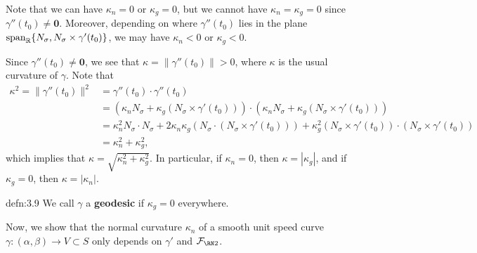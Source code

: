 Note that we can have $\kappa_n = 0$ or $\kappa_g = 0$, but we cannot 
have $\kappa_n = \kappa_g = 0$ since $\gamma''(t_0) \neq \mathbf 0$. 
Moreover, depending on where $\gamma''(t_0)$ lies in the plane 
$\operatorname{span}_{\mathbb{R}}\{N_\sigma, N_\sigma \times \gamma'(t_0)\}$, we may have 
$\kappa_n < 0$ or $\kappa_g < 0$. 

Since $\gamma''(t_0) \neq \mathbf 0$, we see that 
$\kappa = \|\gamma''(t_0)\| > 0$,
where $\kappa$ is the usual curvature of $\gamma$. Note that 
\begin{align*}
    \kappa^2 = \|\gamma''(t_0)\|^2 
    &= \gamma''(t_0) \cdot \gamma''(t_0) \\
    &= (\kappa_n N_\sigma + \kappa_g(N_\sigma \times \gamma'(t_0))) 
    \cdot (\kappa_n N_\sigma + \kappa_g(N_\sigma \times \gamma'(t_0))) \\
    &= \kappa_n^2 N_\sigma \cdot N_\sigma + 2\kappa_n \kappa_g 
    (N_\sigma \cdot (N_\sigma \times \gamma'(t_0))) + \kappa_g^2 
    (N_\sigma \times \gamma'(t_0)) \cdot (N_\sigma \times \gamma'(t_0)) \\ 
    &= \kappa_n^2 + \kappa_g^2, 
\end{align*}
which implies that $\kappa = \sqrt{\kappa_n^2 + \kappa_g^2}$. 
In particular, if $\kappa_n = 0$, then $\kappa = |\kappa_g|$, and if 
$\kappa_g = 0$, then $\kappa = |\kappa_n|$. 

\begin{defn}{defn:3.9}
    We call $\gamma$ a {\bf geodesic} if $\kappa_g = 0$ everywhere. 
\end{defn}\vspace{-0.25cm}

Now, we show that the normal curvature $\kappa_n$ of a smooth unit 
speed curve $\gamma : (\alpha, \beta) \to V \subset S$ only depends on 
$\gamma'$ and $\SFF$. 


